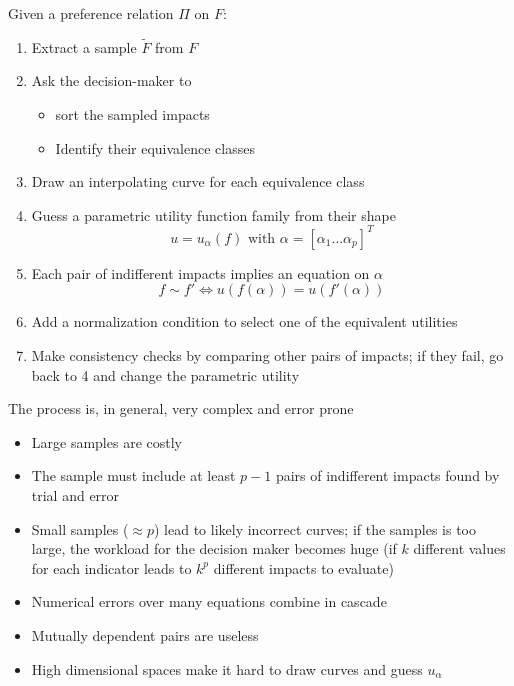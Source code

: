 Given a preference relation $\Pi$ on $F$: 
\begin{enumerate}
	\item Extract a sample $\tilde F$ from $F$
	
	\item Ask the decision-maker to 
	\begin{itemize}
		\item sort the sampled impacts
		
		\item Identify their equivalence classes
	\end{itemize}
	
	\item Draw an interpolating curve for each equivalence class 
	
	\item Guess a parametric utility function family from their shape 
	$$ u = u_\alpha (f) \text{ with } \alpha = \left[\alpha_1 \dots \alpha_p \right]^T $$
	
	\item Each pair of indifferent impacts implies an equation on $\alpha$
	$$ f \sim f' \Leftrightarrow u(f(\alpha)) = u(f'(\alpha)) $$
	
	\item Add a normalization condition to select one of the equivalent utilities
	
	\item Make consistency checks by comparing other pairs of impacts; if they fail, go back to 4 and change the parametric utility
\end{enumerate}

The process is, in general, very complex and error prone
\begin{itemize}
	\item Large samples are costly
	
	\item The sample must include at least $p-1$ pairs of indifferent impacts found by trial and error
	
	\item Small samples ($\approx p$) lead to likely incorrect curves; if the samples is too large, the workload for the decision maker becomes huge (if $k$ different values for each indicator leads to $k^p$ different impacts to evaluate)
	
	\item Numerical errors over many equations combine in cascade
	
	\item Mutually dependent pairs are useless
	
	\item High dimensional spaces make it hard to draw curves and guess $u_\alpha$
\end{itemize}


